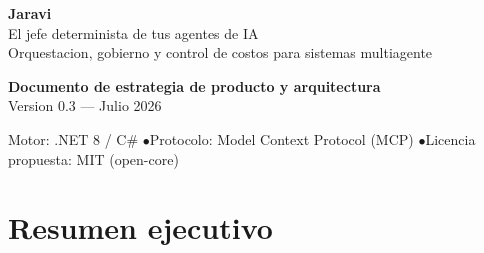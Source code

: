 \documentclass[11pt]{article}
\begin{document}
\sloppy

\begin{titlepage}

\vspace{2.2cm}
\begin{flushleft}
\hspace{2cm}
\begin{minipage}{0.85\textwidth}
{\color{white}\sffamily\bfseries\fontsize{40}{44}\selectfont Jaravi}\\[6pt]
{\color{jaraviaccent!80!white}\sffamily\Large El jefe determinista de tus agentes de IA}\\[4pt]
{\color{white!70!jaravinavy}\sffamily\small Orquestacion, gobierno y control de costos para sistemas multiagente}
\end{minipage}
\end{flushleft}

\vspace{3.6cm}
\begin{center}
\begin{minipage}{0.8\textwidth}
\centering
{\sffamily\large\bfseries\color{jaravinavy} Documento de estrategia de producto y arquitectura}\\[8pt]
{\sffamily\color{jaravimuted} Version 0.3 --- Julio 2026}
\end{minipage}
\end{center}

\vfill
\begin{center}
{\sffamily\small\color{jaravimuted}
Motor: .NET 8 / C\# \quad$\bullet$\quad Protocolo: Model Context Protocol (MCP) \quad$\bullet$\quad Licencia propuesta: MIT (open-core)
}
\end{center}
\vspace{1cm}
\end{titlepage}

\tableofcontents
\thispagestyle{empty}
\newpage

\section{Resumen ejecutivo}
\end{document}
